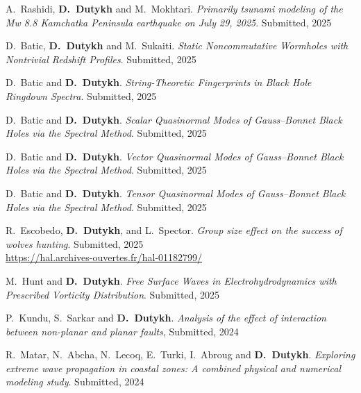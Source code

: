 \begin{etaremune}

  \item A.~Rashidi, \textbf{D.~Dutykh} and M.~Mokhtari. \textit{Primarily tsunami modeling of the Mw 8.8 Kamchatka Peninsula earthquake on July 29, 2025}. Submitted, 2025 %

  \item D.~Batic, \textbf{D.~Dutykh} and M.~Sukaiti. \textit{Static Noncommutative Wormholes with Nontrivial Redshift Profiles}. Submitted, 2025 %

  \item D.~Batic and \textbf{D.~Dutykh}. \textit{String-Theoretic Fingerprints in Black Hole Ringdown Spectra}. Submitted, 2025 %

  \item D.~Batic and \textbf{D.~Dutykh}. \textit{Scalar Quasinormal Modes of Gauss--Bonnet Black Holes via the Spectral Method}. Submitted, 2025 %

  \item D.~Batic and \textbf{D.~Dutykh}. \textit{Vector Quasinormal Modes of Gauss--Bonnet Black Holes via the Spectral Method}. Submitted, 2025 %
  
  \item D.~Batic and \textbf{D.~Dutykh}. \textit{Tensor Quasinormal Modes of Gauss--Bonnet Black Holes via the Spectral Method}. Submitted, 2025 %

  \item R.~Escobedo, \textbf{D.~Dutykh}, and L.~Spector. \textit{Group size effect on the success of wolves hunting}. Submitted, 2025 \\ %
  \url{https://hal.archives-ouvertes.fr/hal-01182799/}

  \item M.~Hunt and \textbf{D.~Dutykh}. \textit{Free Surface Waves in Electrohydrodynamics with Prescribed Vorticity Distribution}. Submitted, 2025 %

  \item P.~Kundu, S.~Sarkar and \textbf{D.~Dutykh}. \textit{Analysis of the effect of interaction between non-planar and planar faults}, Submitted, 2024 %

  \item R.~Matar, N.~Abcha, N.~Lecoq, E.~Turki, I.~Abroug and \textbf{D.~Dutykh}. \textit{Exploring extreme wave propagation in coastal zones: A combined physical and numerical modeling study}. Submitted, 2024 %


\end{etaremune}
